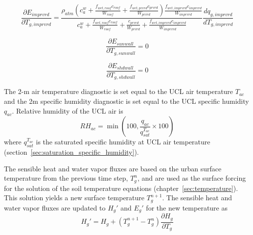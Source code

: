 \documentclass[12pt,authoryear]{elsarticle}
\numberwithin{equation}{section} %
\begin{document}
\begin{equation}
\label{eq:partial_derivatives_latent_flux_temperature_imprvrd}
\frac{\partial E_{imprvrd}}{\partial T_{g,imprvrd}} = \frac{\rho_{atm}\left(c_{a}^{w}+\frac{f_{wet,roof}c_{roof}}{W_{roof}}+\frac{f_{wet,prvrd}c_{prvrd}}{W_{prvrd}}\right)\frac{f_{wet,imprvrd}c_{imprvrd}}{W_{imprvrd}}}{c_{a}^{w}+\frac{f_{wet,roof}c_{roof}}{W_{roof}}+\frac{c_{prvrd}}{W_{prvrd}}+\frac{f_{wet,imprvrd}c_{imprvrd}}{W_{imprvrd}}}\frac{d q_{g,imprvrd}}{d T_{g,imprvrd}}
\end{equation}

\begin{equation}
\label{eq:partial_derivatives_latent_flux_temperature_sunwall}
\frac{\partial E_{sunwall}}{\partial T_{g,sunwall}} = 0
\end{equation}

\begin{equation}
\label{eq:partial_derivatives_latent_flux_temperature_shdwall}
\frac{\partial E_{shdwall}}{\partial T_{g,shdwall}} = 0
\end{equation}

The 2-m air temperature diagnostic is set equal to the UCL air temperature $T_{ac}$ and the 2m specific humidity diagnostic is set equal to the UCL specific humidity $q_{ac}$. Relative humidity of the UCL air is
\begin{equation}
RH_{ac} = \min(100, \frac{q_{ac}}{q_{sat}^{T_{ac}}}\times 100)
\end{equation}
where $q_{sat}^{T_{ac}}$ is the saturated specific humidity at UCL air temperature (section~\ref{sec:saturation_specific_humidity}). 

The sensible heat and water vapor fluxes are based on the urban surface temperature from the previous time step, $T_{g}^{n}$, and are used as the surface forcing for the solution of the soil temperature equations (chapter~\ref{sec:temperature}). This solution yields a new surface temperature $T_{g}^{n+1}$. The sensible heat and water vapor fluxes are updated to $H_{g}'$ and $E_{g}'$ for the new temperature as
\begin{equation}
H_{g}'=H_{g}+(T_{g}^{n+1}-T_{g}^{n})\frac{\partial H_{g}}{\partial T_{g}}
\end{equation}
\end{document}
